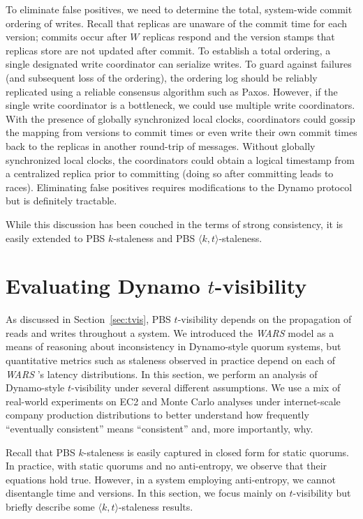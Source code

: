 \documentclass{vldb}
\begin{document}
To eliminate false positives, we need to determine the total,
system-wide commit ordering of writes. Recall that replicas are
unaware of the commit time for each version; commits occur after $W$
replicas respond and the version stamps that replicas store are not
updated after commit.  To establish a total ordering, a single
designated write coordinator can serialize writes.  To guard against
failures (and subsequent loss of the ordering), the ordering log
should be reliably replicated using a reliable consensus algorithm
such as Paxos.  However, if the single write coordinator is a
bottleneck, we could use multiple write coordinators.  With the
presence of globally synchronized local clocks, coordinators could
gossip the mapping from versions to commit times or even write their
own commit times back to the replicas in another round-trip of
messages.  Without globally synchronized local clocks, the
coordinators could obtain a logical timestamp from a centralized
replica prior to committing (doing so after committing leads to
races).  Eliminating false positives requires modifications to the
Dynamo protocol but is definitely tractable.

While this discussion has been couched in the terms of strong
consistency, it is easily extended to PBS $k$-staleness and PBS
$\langle k, t \rangle$-staleness.

\section{Evaluating Dynamo $t$-visibility}
\label{sec:dynamoeval}

As discussed in Section~\ref{sec:tvis}, PBS $t$-visibility depends on
the propagation of reads and writes throughout a system.  We
introduced the \textit{WARS}  model as a means of reasoning about
inconsistency in Dynamo-style quorum systems, but quantitative metrics
such as staleness observed in practice depend on each of \textit{WARS} 's
latency distributions.  In this section, we perform an analysis of
Dynamo-style $t$-visibility under several different assumptions.  We
use a mix of real-world experiments on EC2 and Monte Carlo analyses
under internet-scale company production distributions to better
understand how frequently ``eventually consistent'' means
``consistent'' and, more importantly, why.

Recall that PBS $k$-staleness is easily captured in closed form for
static quorums.  In practice, with static quorums and no anti-entropy,
we observe that their equations hold true.  However, in a system
employing anti-entropy, we cannot disentangle time and versions.  In
this section, we focus mainly on $t$-visibility but briefly describe
some $\langle k, t \rangle$-staleness results.
\end{document}
